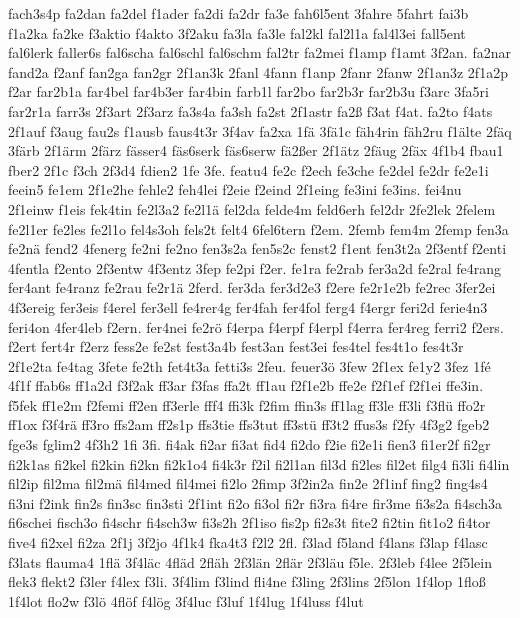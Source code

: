{fach3s4p
fa2dan
fa2del
f1ader
fa2di
fa2dr
fa3e
fah6l5ent
3fahre
5fahrt
fai3b
f1a2ka
fa2ke
f3aktio
f4akto
3f2aku
fa3la
fa3le
fal2kl
fal2l1a
fal4l3ei
fall5ent
fal6lerk
faller6s
fal6scha
fal6schl
fal6schm
fal2tr
fa2mei
f1amp
f1amt
3f2an.
fa2nar
fand2a
f2anf
fan2ga
fan2gr
2f1an3k
2fanl
4fann
f1anp
2fanr
2fanw
2f1an3z
2f1a2p
f2ar
far2b1a
far4bel
far4b3er
far4bin
farb1l
far2bo
far2b3r
far2b3u
f3arc
3fa5ri
far2r1a
farr3s
2f3art
2f3arz
fa3s4a
fa3sh
fa2st
2f1astr
fa2ß
f3at
f4at.
fa2to
f4ats
2f1auf
f3aug
fau2s
f1ausb
faus4t3r
3f4av
fa2xa
1fä
3fä1c
fäh4rin
fäh2ru
f1älte
2fäq
3färb
2f1ärm
2färz
fässer4
fäs6serk
fäs6serw
fä2ßer
2f1ätz
2fäug
2fäx
4f1b4
fbau1
fber2
2f1c
f3ch
2f3d4
fdien2
1fe
3fe.
featu4
fe2c
f2ech
fe3che
fe2del
fe2dr
fe2e1i
feein5
fe1em
2f1e2he
fehle2
feh4lei
f2eie
f2eind
2f1eing
fe3ini
fe3ins.
fei4nu
2f1einw
f1eis
fek4tin
fe2l3a2
fe2l1ä
fel2da
felde4m
feld6erh
fel2dr
2fe2lek
2felem
fe2l1er
fe2les
fe2l1o
fel4s3oh
fels2t
felt4
6fel6tern
f2em.
2femb
fem4m
2femp
fen3a
fe2nä
fend2
4fenerg
fe2ni
fe2no
fen3s2a
fen5s2c
fenst2
f1ent
fen3t2a
2f3entf
f2enti
4fentla
f2ento
2f3entw
4f3entz
3fep
fe2pi
f2er.
fe1ra
fe2rab
fer3a2d
fe2ral
fe4rang
fer4ant
fe4ranz
fe2rau
fe2r1ä
2ferd.
fer3da
fer3d2e3
f2ere
fe2r1e2b
fe2rec
3fer2ei
4f3ereig
fer3eis
f4erel
fer3ell
fe4rer4g
fer4fah
fer4fol
ferg4
f4ergr
feri2d
ferie4n3
feri4on
4fer4leb
f2ern.
fer4nei
fe2rö
f4erpa
f4erpf
f4erpl
f4erra
fer4reg
ferri2
f2ers.
f2ert
fert4r
f2erz
fess2e
fe2st
fest3a4b
fest3an
fest3ei
fes4tel
fes4t1o
fes4t3r
2f1e2ta
fe4tag
3fete
fe2th
fet4t3a
fetti3s
2feu.
feuer3ö
3few
2f1ex
fe1y2
3fez
1fé
4f1f
ffab6s
ff1a2d
f3f2ak
ff3ar
f3fas
ffa2t
ff1au
f2f1e2b
ffe2e
f2f1ef
f2f1ei
ffe3in.
f5fek
ff1e2m
f2femi
ff2en
ff3erle
fff4
ffi3k
f2fim
ffin3s
ff1lag
ff3le
ff3li
f3flü
ffo2r
ff1ox
f3f4rä
ff3ro
ffs2am
ff2s1p
ffs3tie
ffs3tut
ff3stü
ff3t2
ffus3s
f2fy
4f3g2
fgeb2
fge3s
fglim2
4f3h2
1fi
3fi.
fi4ak
fi2ar
fi3at
fid4
fi2do
f2ie
fi2e1i
fien3
fi1er2f
fi2gr
fi2k1as
fi2kel
fi2kin
fi2kn
fi2k1o4
fi4k3r
f2il
fi2l1an
fil3d
fi2les
fil2et
filg4
fi3li
fi4lin
fil2ip
fil2ma
fil2mä
fil4med
fil4mei
fi2lo
2fimp
3f2in2a
fin2e
2f1inf
fing2
fing4s4
fi3ni
f2ink
fin2s
fin3sc
fin3sti
2f1int
fi2o
fi3ol
fi2r
fi3ra
fi4re
fir3me
fi3s2a
fi4sch3a
fi6schei
fisch3o
fi4schr
fi4sch3w
fi3s2h
2f1iso
fis2p
fi2s3t
fite2
fi2tin
fit1o2
fi4tor
five4
fi2xel
fi2za
2f1j
3f2jo
4f1k4
fka4t3
f2l2
2fl.
f3lad
f5land
f4lans
f3lap
f4lasc
f3lats
flauma4
1flä
3f4läc
4fläd
2fläh
2f3län
2flär
2f3läu
f5le.
2f3leb
f4lee
2f5lein
flek3
flekt2
f3ler
f4lex
f3li.
3f4lim
f3lind
fli4ne
f3ling
2f3lins
2f5lon
1f4lop
1floß
1f4lot
flo2w
f3lö
4flöf
f4lög
3f4luc
f3luf
1f4lug
1f4luss
f4lut
}
